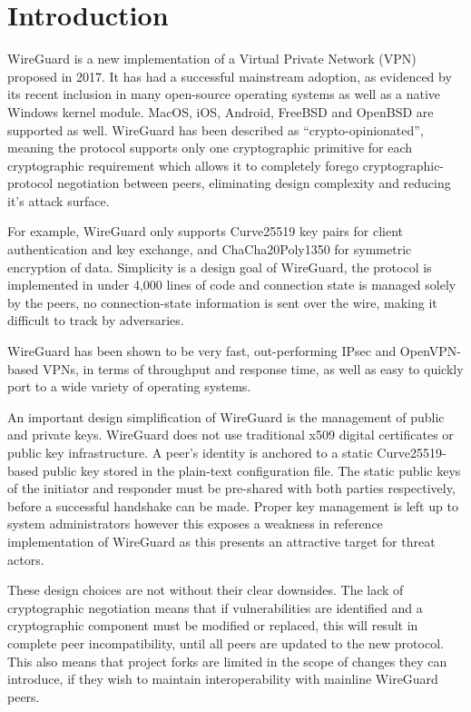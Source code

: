 \documentclass [11pt, proquest] {uwthesis}[2020/02/24]
\begin{document}
\textpages

\chapter {Introduction} \label{introduction}

WireGuard is a new implementation of a Virtual Private Network (VPN) proposed in 2017. It has had a successful mainstream adoption, as evidenced by its recent inclusion in many open-source operating systems\cite{donenfeld_wireguard_nodate} as well as a native Windows kernel module\cite{noauthor_wireguard-nt_nodate}. MacOS, iOS, Android, FreeBSD and OpenBSD are supported as well.
WireGuard has been described as “crypto-opinionated”, meaning the protocol supports only one cryptographic primitive for each cryptographic requirement which allows it to completely forego cryptographic-protocol negotiation between peers, eliminating design complexity and reducing it's attack surface. 

For example, WireGuard only supports Curve25519 key pairs for client authentication and key exchange, and ChaCha20Poly1350 for symmetric 
encryption\cite{donenfeld_wireguard_2017} of data.
Simplicity is a design goal of WireGuard, the protocol is implemented in under 4,000 lines of code and connection state is managed solely by the peers, no connection-state information is sent over the wire, making it difficult to track by adversaries.

WireGuard has been shown to be very fast, out-performing IPsec and OpenVPN-based VPNs, in terms of throughput and response time\cite{donenfeld_performance_2018}, as well as easy to quickly port to a wide variety of operating systems. 

An important design simplification of WireGuard is the management of public and private keys. WireGuard does not use traditional x509 digital certificates or public key infrastructure. A peer's identity is anchored to a static Curve25519-based public key stored in the plain-text configuration file.
The static public keys of the initiator and responder must be pre-shared with both parties respectively, before a successful handshake can be made. 
Proper key management is left up to system administrators however this exposes a weakness in reference implementation of WireGuard as this presents an attractive target for threat actors.

These design choices are not without their clear downsides. The lack of cryptographic negotiation means that if vulnerabilities are identified and a cryptographic component must be modified or replaced, this will result in complete peer incompatibility, until all peers are updated to the new protocol. This also means that project forks are limited in the scope of changes they can introduce, if they wish to maintain interoperability with mainline WireGuard peers.
\end{document}

